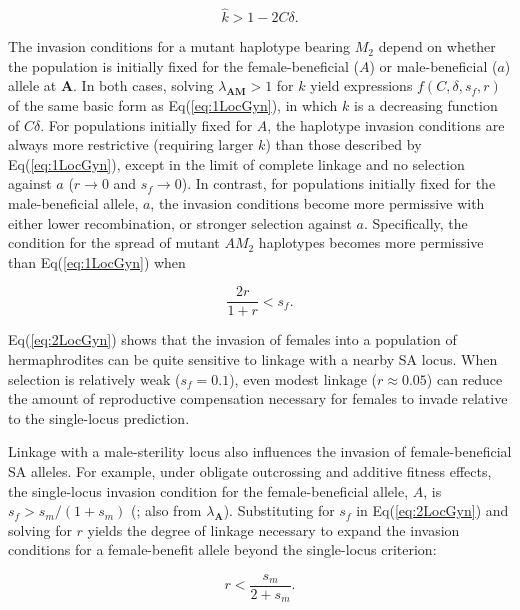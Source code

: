 \documentclass[9pt,twocolumn,twoside,lineno]{gsajnl}
\begin{document}
\begin{equation}\label{eq:1LocGyn}
	\hat{k} > 1 - 2 C \delta.
\end{equation}

\noindent The invasion conditions for a mutant haplotype bearing $M_2$ depend on whether the population is initially fixed for the female-beneficial ($A$) or male-beneficial ($a$) allele at $\mathbf{A}$. In both cases, solving $\lambda_{\mathbf{AM}} > 1$ for $k$ yield expressions $f(C,\delta,s_f,r)$ of the same basic form as Eq(\ref{eq:1LocGyn}), in which $k$ is a decreasing function of $C \delta$. For populations initially fixed for $A$, the haplotype invasion conditions are always more restrictive (requiring larger $k$) than those described by Eq(\ref{eq:1LocGyn}), except in the limit of complete linkage and no selection against $a$ ($r \rightarrow 0$ and $s_f \rightarrow  0$). In contrast, for populations initially fixed for the male-beneficial allele, $a$, the invasion conditions become more permissive with either lower recombination, or stronger selection against $a$. Specifically, the condition for the spread of mutant $AM_2$ haplotypes becomes more permissive than Eq(\ref{eq:1LocGyn}) when 

\begin{equation}\label{eq:2LocGyn}
	\frac{2 r}{1 + r} < s_f.
\end{equation}

\noindent Eq(\ref{eq:2LocGyn}) shows that the invasion of females into a population of hermaphrodites can be quite sensitive to linkage with a nearby SA locus. When selection is relatively weak ($s_f = 0.1$), even modest linkage ($r\approx0.05$) can reduce the amount of reproductive compensation necessary for females to invade relative to the single-locus prediction. 

Linkage with a male-sterility locus also influences the invasion of female-beneficial SA alleles. For example, under obligate outcrossing and additive fitness effects, the single-locus invasion condition for the female-beneficial allele, $A$, is $s_f > s_m / (1+s_m)$ (\citealt{Kidwell1977}; also from $\lambda_{\mathbf{A}}$). Substituting for $s_f$ in Eq(\ref{eq:2LocGyn}) and solving for $r$ yields the degree of linkage necessary to expand the invasion conditions for a female-benefit allele beyond the single-locus criterion:

\begin{equation}\label{eq:2LocGynSA}
	r < \frac{s_m}{2 + s_m}.
\end{equation}
\end{document}

